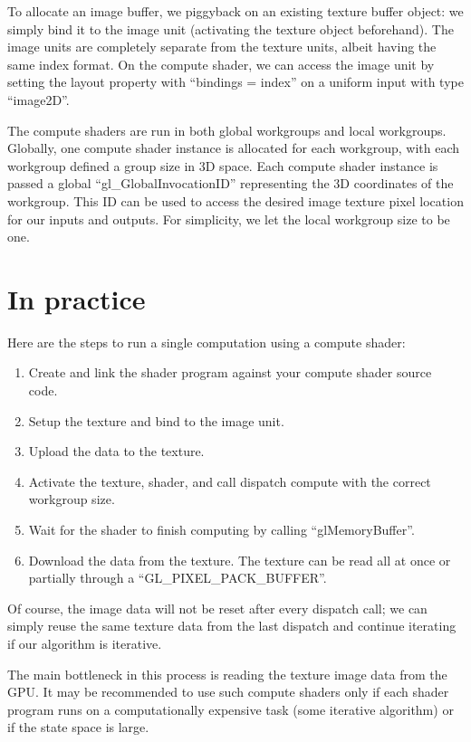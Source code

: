 \documentclass[11pt]{article}
\begin{document}
To allocate an image buffer, we piggyback on an existing texture buffer object: we simply bind it to the image unit (activating the texture object beforehand). The image units are completely separate from the texture units, albeit having the same index format. On the compute shader, we can access the image unit by setting the layout property with ``bindings = index'' on a uniform input with type ``image2D''.

The compute shaders are run in both global workgroups and local workgroups. Globally, one compute shader instance is allocated for each workgroup, with each workgroup defined a group size in 3D space. Each compute shader instance is passed a global ``gl\_GlobalInvocationID'' representing the 3D coordinates of the workgroup. This ID can be used to access the desired image texture pixel location for our inputs and outputs. For simplicity, we let the local workgroup size to be one.

\section{In practice}
Here are the steps to run a single computation using a compute shader:
\begin{enumerate}
	\item Create and link the shader program against your compute shader source code.
	\item Setup the texture and bind to the image unit.
	\item Upload the data to the texture.
	\item Activate the texture, shader, and call dispatch compute with the correct workgroup size.
	\item Wait for the shader to finish computing by calling ``glMemoryBuffer''.
	\item Download the data from the texture. The texture can be read all at once or partially through a ``GL\_PIXEL\_PACK\_BUFFER''.
\end{enumerate}

Of course, the image data will not be reset after every dispatch call; we can simply reuse the same texture data from the last dispatch and continue iterating if our algorithm is iterative.

The main bottleneck in this process is reading the texture image data from the GPU. It may be recommended to use such compute shaders only if each shader program runs on a computationally expensive task (some iterative algorithm) or if the state space is large.
\end{document}
